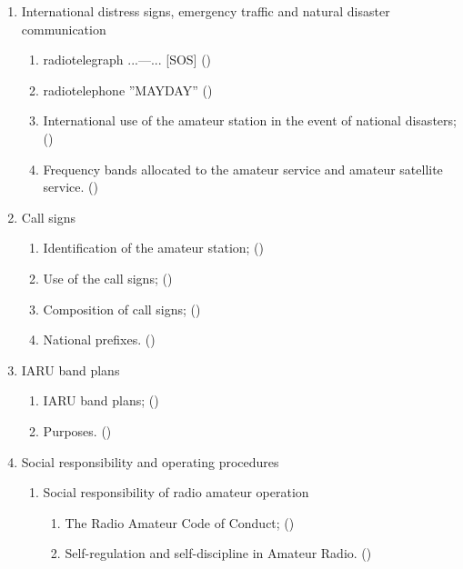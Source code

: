 \begin{flushleft}
\begin{enumerate}
\item International distress signs, emergency traffic and natural disaster
  communication
\begin{enumerate}
\item radiotelegraph ...---... [SOS] ()\label{HAREC.b.4.1}
\item radiotelephone ''MAYDAY'' ()\label{HAREC.b.4.2}
\item International use of the amateur station in the event of national
  disasters; ()\label{HAREC.b.4.3}
\item Frequency bands allocated to the amateur service and amateur satellite
  service. ()\label{HAREC.b.4.4}
\end{enumerate}

\item Call signs
\begin{enumerate}
\item Identification of the amateur station;
  ()\label{HAREC.b.5.1}
\item Use of the call signs; ()\label{HAREC.b.5.2}
\item Composition of call signs; ()\label{HAREC.b.5.3}
\item National prefixes. ()\label{HAREC.b.5.4}
\end{enumerate}

\item IARU band plans
\begin{enumerate}
\item IARU band plans; ()\label{HAREC.b.6.1}
\item Purposes. ()\label{HAREC.b.6.2}
\end{enumerate}

\item Social responsibility and operating procedures
\begin{enumerate}
\item Social responsibility of radio amateur operation
\begin{enumerate}
\item The Radio Amateur Code of Conduct;
  ()\label{HAREC.b.7.1.1}
\item Self-regulation and self-discipline in Amateur Radio.
  ()\label{HAREC.b.7.1.2}
\end{enumerate}


\end{enumerate}
\end{enumerate}
\end{flushleft}
